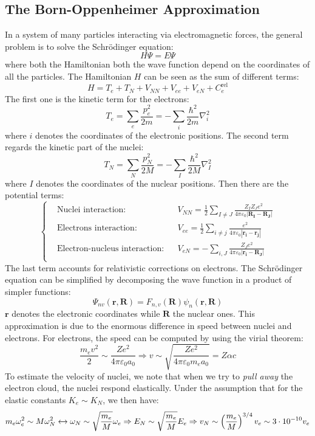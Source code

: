 \documentclass[10.75pt,a4paper,openright,bottom=2cm]{article}
\renewcommand{\Vec}[1]{\boldsymbol{#1}}
\begin{document}
\subsection{The Born-Oppenheimer Approximation}
In a system of many particles interacting via electromagnetic forces, the general problem is to solve the Schr\"odinger equation:
\[
H\Psi=E\Psi
\]
where both the Hamiltonian both the wave function depend on the coordinates of all the particles. The Hamiltonian $H$ can be seen as the sum of different terms:
\[
H=T_e+T_N+V_{NN}+V_{ee}+V_{eN}+C_e^{\text{rel}}
\]
The first one is the kinetic term for the electrons:
\[
T_e=\sum_e\frac{p_e^2}{2m}=-\sum_i\frac{\hbar^2}{2m}\nabla_i^2
\]
where $i$ denotes the coordinates of the electronic positions. The second term regards the kinetic part of the nuclei:
\[
T_N=\sum_N\frac{p_N^2}{2M}=-\sum_I\frac{\hbar^2}{2M}\nabla^2_I
\]
where $I$ denotes the coordinates of the nuclear positions. Then there are the potential terms:
\[
\left\{
\begin{aligned}
&\text{Nuclei interaction:} &&V_{NN}=\frac{1}{2}\sum_{I\neq J}\frac{Z_IZ_Je^2}{4\pi\varepsilon_0|\Vec{R_I}-\Vec{R_J}|}\\
&\text{Electrons interaction:} &&V_{ee}=\frac{1}{2}\sum_{i\neq j}\frac{e^2}{4\pi\varepsilon_0|\Vec{r_i}-\Vec{r_j}|}\\
&\text{Electron-nucleus interaction:} &&V_{eN}=-\sum_{i,J}\frac{Z_Je^2}{4\pi\varepsilon_0|\Vec{r_i}-\Vec{R_J}|}\\
\end{aligned}
\right.
\]
The last term accounts for relativistic corrections on electrons. The Schr\"odinger equation can be simplified by decomposing the wave function in a product of simpler functions:
\[
\Psi_{nv}(\Vec{r},\Vec{R})=F_{n,v}(\Vec{R})\psi_n(\Vec{r},\Vec{R})
\]
$\Vec{r}$ denotes the electronic coordinates while $\Vec{R}$ the nuclear ones. This approximation is due to the enormous difference in speed between nuclei and electrons. For electrons, the speed can be computed by using the virial theorem:
\[
\frac{m_ev^2}{2}\sim\frac{Ze^2}{4\pi\varepsilon_0a_0}\Rightarrow v\sim\sqrt{\frac{Ze^2}{4\pi\varepsilon_0m_ea_0}}=Z\alpha c
\]
To estimate the velocity of nuclei, we note that when we try to \textit{pull away} the electron cloud, the nuclei respond elastically. Under the assumption that for the elastic constants $K_e\sim K_N$, we then have:
\[
m_e\omega_e^2\sim M\omega_N^2\xleftrightarrow[]{}\omega_N\sim\sqrt{\frac{m_e}{M}}\omega_e\Rightarrow E_N\sim\sqrt{\frac{m_e}{M}}E_e\Rightarrow v_N\sim\left(\frac{m_e}{M}\right)^{3/4}v_e\sim3\cdot10^{-10}v_e
\]
\end{document}
